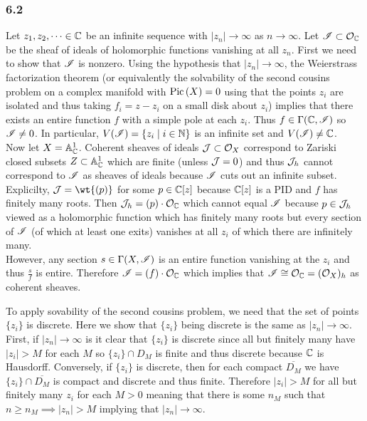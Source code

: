 \documentclass[12pt]{article}
\begin{document}
\subsubsection{6.2}

Let $z_1, z_2, \dots \in \mathbb{C}$ be an infinite sequence with $|z_n| \to \infty$ as $n \to \infty$. Let $\mathscr{I} \subset \mathcal{O}_{\mathbb{C}}$ be the sheaf of ideals of holomorphic functions vanishing at all $z_n$. First we need to show that $\mathscr{I}$ is nonzero. Using the hypothesis that $|z_n| \to \infty$, the Weierstrass factorization theorem (or equivalently the solvability of the second cousins problem on a complex manifold with $\mathrm{Pic} \left( X \right) = 0$ using that the points $z_i$ are isolated and thus taking $f_i = z - z_i$ on a small disk about $z_i$) implies that there exists an entire function $f$ with a simple pole at each $z_i$. Thus $f \in \Gamma(\mathbb{C}, \mathscr{I})$ so $\mathscr{I} \neq 0$. In particular, $V(\mathscr{I}) = \{ z_i \mid i \in \mathbb{N} \}$ is an infinite set and $V(\mathscr{I}) \neq \mathbb{C}$.
\bigskip\\
Now let $X = \mathbb{A}^1_{\mathbb{C}}$. Coherent sheaves of ideals $\mathcal{J} \subset \mathcal{O}_{X}$ correspond to Zariski closed subsets $Z \subset \mathbb{A}^1_{\mathbb{C}}$ which are finite (unless $\mathcal{J} = 0$) and thus $\mathcal{J}_h$ cannot correspond to $\mathscr{I}$ as sheaves of ideals because $\mathscr{I}$ cuts out an infinite subset. Explicilty, $\J = \wt{(p)}$ for some $p \in \mathbb{C}[z]$ because $\mathbb{C}[z]$ is a PID and $f$ has finitely many roots. Then $\mathcal{J}_h = (p) \cdot \mathcal{O}_{\mathbb{C}}$ which cannot equal $\mathscr{I}$ because $p \in \mathcal{J}_h$ viewed as a holomorphic function which has finitely many roots but every section of $\mathscr{I}$ (of which at least one exits) vanishes at all $z_i$ of which there are infinitely many. 
\bigskip\\
However, any section $s \in \Gamma(X, \mathscr{I})$ is an entire function vanishing at the $z_i$ and thus $\frac{s}{f}$ is entire. Therefore $\mathscr{I} = (f) \cdot \mathcal{O}_{\mathbb{C}}$ which implies that $\mathscr{I} \cong \mathcal{O}_{\mathbb{C}} = (\mathcal{O}_{X})_h$ as coherent sheaves.

\begin{rmk}
To apply sovability of the second cousins problem, we need that the set of points $\{ z_i \}$ is discrete. Here we show that $\{ z_i \}$ being discrete is the same as $|z_n| \to \infty$. First, if $|z_n| \to \infty$ is it clear that $\{ z_i \}$ is discrete since all but finitely many have $|z_i| > M$ for each $M$ so $\{ z_i \} \cap D_M$ is finite and thus discrete because $\mathbb{C}$ is Hausdorff. Conversely, if $\{ z_i \}$ is discrete, then for each compact $\overline{D_M}$ we have $\{ z_i \} \cap \overline{D_M}$ is compact and discrete and thus finite. Therefore $|z_i| > M$ for all but finitely many $z_i$ for each $M > 0$ meaning that there is some $n_M$ such that $n \ge n_M \implies |z_n| > M$ implying that $|z_n| \to \infty$. 
\end{rmk}
\end{document}
